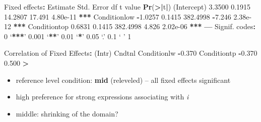 \documentclass[ignorenonframetext,]{beamer}
\newenvironment{Shaded}{\begin{snugshade}}{\end{snugshade}}
\newcommand{\KeywordTok}[1]{\textcolor[rgb]{0.13,0.29,0.53}{\textbf{#1}}}
\newcommand{\DecValTok}[1]{\textcolor[rgb]{0.00,0.00,0.81}{#1}}
\newcommand{\FloatTok}[1]{\textcolor[rgb]{0.00,0.00,0.81}{#1}}
\newcommand{\StringTok}[1]{\textcolor[rgb]{0.31,0.60,0.02}{#1}}
\newcommand{\OperatorTok}[1]{\textcolor[rgb]{0.81,0.36,0.00}{\textbf{#1}}}
\newcommand{\ErrorTok}[1]{\textcolor[rgb]{0.64,0.00,0.00}{\textbf{#1}}}
\newcommand{\NormalTok}[1]{#1}
\providecommand{\tightlist}{%
  \setlength{\itemsep}{0pt}\setlength{\parskip}{0pt}}
\newcommand{\cond}[1]{\textbf{#1}}
\begin{document}
\begin{frame}[fragile]

\tiny

\begin{Shaded}
\begin{Highlighting}[]
\NormalTok{Fixed effects}\OperatorTok{:}
\StringTok{             }\NormalTok{Estimate Std. Error       df t value }\KeywordTok{Pr}\NormalTok{(}\OperatorTok{>}\ErrorTok{|}\NormalTok{t}\OperatorTok{|}\NormalTok{)    }
\NormalTok{(Intercept)    }\FloatTok{3.3500}     \FloatTok{0.1915}  \FloatTok{14.2807}  \FloatTok{17.491} \FloatTok{4.80e-11} \OperatorTok{**}\ErrorTok{*}
\NormalTok{Conditionlow  }\OperatorTok{-}\FloatTok{1.0257}     \FloatTok{0.1415} \FloatTok{382.4998}  \OperatorTok{-}\FloatTok{7.246} \FloatTok{2.38e-12} \OperatorTok{**}\ErrorTok{*}
\NormalTok{Conditiontop   }\FloatTok{0.6831}     \FloatTok{0.1415} \FloatTok{382.4998}   \FloatTok{4.826} \FloatTok{2.02e-06} \OperatorTok{**}\ErrorTok{*}
\OperatorTok{---}
\NormalTok{Signif. codes}\OperatorTok{:}\StringTok{  }\DecValTok{0}\NormalTok{ ‘}\OperatorTok{**}\ErrorTok{*}\NormalTok{’ }\FloatTok{0.001}\NormalTok{ ‘}\OperatorTok{**}\NormalTok{’ }\FloatTok{0.01}\NormalTok{ ‘}\OperatorTok{*}\NormalTok{’ }\FloatTok{0.05}\NormalTok{ ‘.’ }\FloatTok{0.1}\NormalTok{ ‘ ’ }\DecValTok{1}

\NormalTok{Correlation of Fixed Effects}\OperatorTok{:}
\StringTok{            }\NormalTok{(Intr) Cndtnl}
\NormalTok{Conditionlw }\OperatorTok{-}\FloatTok{0.370}       
\NormalTok{Conditiontp }\OperatorTok{-}\FloatTok{0.370}  \FloatTok{0.500}
\OperatorTok{>}\StringTok{ }
\end{Highlighting}
\end{Shaded}

\normalsize

\begin{itemize}
\tightlist
\item
  reference level condition: \cond{mid} (releveled) -- all fixed effects
  significant
\item
  high preference for strong expressions associating with \emph{i}
\item
  middle: shrinking of the domain?
\end{itemize}

\end{frame}
\end{document}
